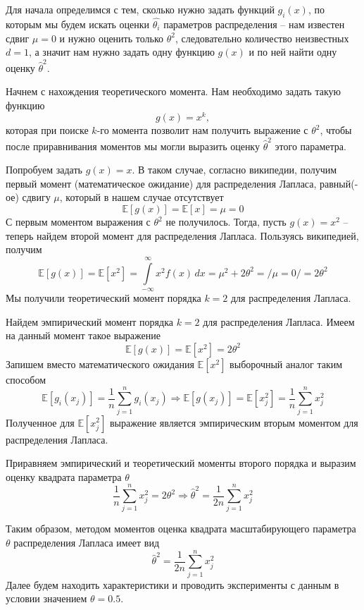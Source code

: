 \documentclass[a4paper, 12pt]{article}
\begin{document}
    Для начала определимся с тем, сколько нужно задать функций $g_i(x)$, по которым мы будем искать оценки $\hat{\theta_i}$
    параметров распределения -- нам известен сдвиг $\mu=0$ и нужно оценить только $\theta^2$, следовательно количество
    неизвестных $d=1$, а значит нам нужно задать одну функцию $g(x)$ и по ней найти одну оценку $\hat{\theta}^2$.


    Начнем с нахождения теоретического момента. Нам необходимо задать такую функцию $$g(x)=x^k,$$ которая
    при поиске $k$-го момента позволит нам получить выражение с $\theta^2$, чтобы после приравнивания моментов
    мы могли выразить оценку $\hat{\theta}^2$ этого параметра.


    Попробуем задать $g(x)=x$. В таком случае, согласно википедии, получим первый момент
    (математическое ожидание) для распределения Лапласа, равный(-ое)
    сдвигу $\mu$, который в нашем случае отсутствует
    $$\mathbb{E}\left[g(x)\right]=\mathbb{E}\left[x\right]=\mu=0$$
    С первым моментом выражения с $\theta^2$ не получилось. Тогда, пусть $g(x)=x^2$ -- теперь
    найдем второй момент для распределения Лапласа. Пользуясь википедией, получим
    $$\mathbb{E}\left[g(x)\right]=\mathbb{E}\left[x^2\right]=\int\limits_{-\infty}^{\infty}x^2f(x)\,dx=\mu^2+2\theta^2=/\mu=0/=2\theta^2$$
    Мы получили теоретический момент порядка $k=2$ для распределения Лапласа.
    
    
    Найдем эмпирический момент порядка $k=2$ для распределения Лапласа. Имеем на данный момент такое выражение
    $$\mathbb{E}\left[g(x)\right]=\mathbb{E}\left[x^2\right]=2\theta^2$$
    Запишем вместо математического ожидания $\mathbb{E}\left[x^2\right]$ выборочный аналог таким способом
    $$\mathbb{E}\left[g_i(x_j)\right]=\dfrac{1}{n}\sum\limits_{j=1}^{n}g_i(x_j)\Rightarrow \mathbb{E}\left[g(x_j)\right]=\mathbb{E}\left[x_j^2\right]=\dfrac{1}{n}\sum\limits_{j=1}^{n}x_j^2$$
    Полученное для $\mathbb{E}\left[x_j^2\right]$ выражение является эмпирическим вторым моментом для распределения Лапласа.


    Приравняем эмпирический и теоретический моменты второго порядка и выразим оценку квадрата параметра $\theta$
    $$\dfrac{1}{n}\sum\limits_{j=1}^{n}x_j^2=2\theta^2\Rightarrow\hat{\theta}^2=\dfrac{1}{2n}\sum\limits_{j=1}^{n}x_j^2$$


    Таким образом, методом моментов оценка квадрата масштабирующего параметра $\theta$ распределения Лапласа имеет вид
    $$\hat{\theta}^2=\dfrac{1}{2n}\sum\limits_{j=1}^{n}x_j^2$$
    Далее будем находить характеристики и проводить эксперименты с данным в условии значением $\theta=0.5$.
\end{document}
